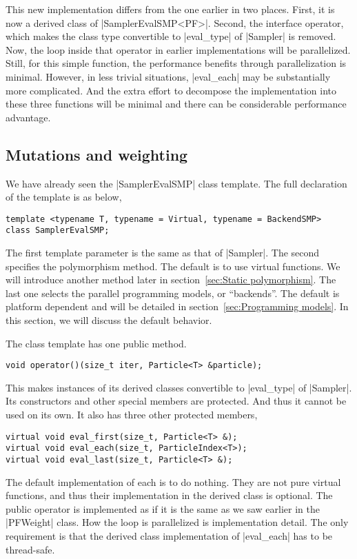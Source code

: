 This new implementation differs from the one earlier in two places. First, it
is now a derived class of |SamplerEvalSMP<PF>|. Second, the interface operator,
which makes the class type convertible to |eval_type| of |Sampler| is removed.
Now, the loop inside that operator in earlier implementations will be
parallelized. Still, for this simple function, the performance benefits through
parallelization is minimal. However, in less trivial situations, |eval_each|
may be substantially more complicated. And the extra effort to decompose the
implementation into these three functions will be minimal and there can be
considerable performance advantage.

\subsection{Mutations and weighting}
\label{sub:Mutations and weighting}

We have already seen the |SamplerEvalSMP| class template. The full declaration
of the template is as below,
\begin{Verbatim}
template <typename T, typename = Virtual, typename = BackendSMP>
class SamplerEvalSMP;
\end{Verbatim}
The first template parameter is the same as that of |Sampler|. The second
specifies the polymorphism method. The default is to use virtual functions. We
will introduce another method later in section~\ref{sec:Static polymorphism}.
The last one selects the parallel programming models, or ``backends''. The
default is platform dependent and will be detailed in
section~\ref{sec:Programming models}. In this section, we will discuss the
default behavior.

The class template has one public method.
\begin{Verbatim}
void operator()(size_t iter, Particle<T> &particle);
\end{Verbatim}
This makes instances of its derived classes convertible to |eval_type| of
|Sampler|. Its constructors and other special members are protected. And thus
it cannot be used on its own. It also has three other protected members,
\begin{Verbatim}
virtual void eval_first(size_t, Particle<T> &);
virtual void eval_each(size_t, ParticleIndex<T>);
virtual void eval_last(size_t, Particle<T> &);
\end{Verbatim}
The default implementation of each is to do nothing. They are not pure virtual
functions, and thus their implementation in the derived class is optional. The
public operator is implemented as if it is the same as we saw earlier in the
|PFWeight| class. How the loop is parallelized is implementation detail. The
only requirement is that the derived class implementation of |eval_each| has to
be thread-safe.

